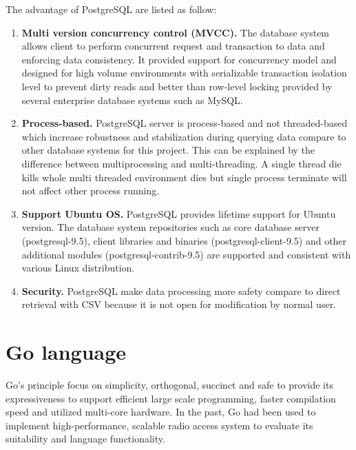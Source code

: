 The advantage of PostgreSQL are listed as follow:

\begin{enumerate}[topsep=0pt,itemsep=-1ex,partopsep=1ex,parsep=1.5ex]
	
	\item \textbf{Multi version concurrency control (MVCC).} The database system allows client to perform concurrent request and transaction to data and enforcing data consistency. \cite{psql-concurrency} It provided support for concurrency model and designed for high volume environments with serializable transaction isolation level to prevent dirty reads and better than row-level locking provided by several enterprise database systems such as MySQL. \cite{psql-mvcc}
	\newline
	
	\item \textbf{Process-based.} PostgreSQL server is process-based and not threaded-based which increase robustness and stabilization during querying data compare to other database systems for this project. This can be explained by the difference between multiprocessing and multi-threading. A single thread die kills whole multi threaded environment dies but single process terminate will not affect other process running.
	\newline
	
	\item \textbf{Support Ubuntu OS.} PostgreSQL provides lifetime support for Ubuntu version. The database system repositories such as core database server (postgresql-9.5), client libraries and binaries (postgresql-client-9.5) and other additional modules (postgresql-contrib-9.5) are supported and consistent with various Linux distribution. \cite{psql-linux-dl}
	
	\item \textbf{Security.} PostgreSQL make data processing more safety compare to direct retrieval with CSV because it is not open for modification by normal user. 
	
	
\end{enumerate}

\pagebreak


\section{Go language}

Go’s principle focus on simplicity, orthogonal, succinct and safe to provide its expressiveness to support efficient large scale programming, faster compilation speed and utilized multi-core hardware.  \cite{expressiveness-of-go} In the past, Go had been used to implement high-performance, scalable radio access system to evaluate its suitability and language functionality. \cite{radio-access-system-with-go} 

